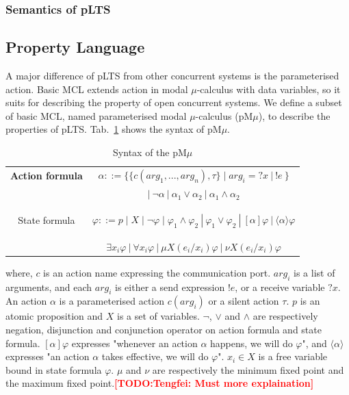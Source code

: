 \documentclass[runningheads,a4paper]{llncs}
\newcommand{\TODO}[1]{\textcolor{red}{\textbf{[TODO:#1]}}}
\begin{document}
\subsubsection{Semantics of pLTS}





\subsection{Property Language}

A major difference of pLTS from other concurrent systems is the parameterised action. Basic MCL\cite{radu2008mcl} extends action in modal $\mu$-calculus with data variables, so it suits for describing the property of open concurrent systems. We define a subset of basic MCL, named parameterised modal $\mu$-calculus (pM$\mu$), to describe the properties of pLTS. Tab.~\ref{mcl} shows the syntax of pM$\mu$.

\begin{table}
	\setlength\tabcolsep{18pt}%
	\centering 
	\caption{Syntax of the pM$\mu$} 
	\label{mcl}
	\begin{tabular}{>{\bfseries}c| c } 
		\hline 		
	Action formula 	&     $\alpha ::= \{\{c(arg_{1}, ..., arg_{n}), \tau\}\mid arg_{i}=?x\ |\ !e\  \}$                  \\
	& $|\ \neg\alpha \ |\ \alpha_{1}\vee\alpha_{2}\ |\ \alpha_{1}\wedge\alpha_{2}$   \\ 	\hline 
		
	State formula 	&  $\varphi ::= p \mid X \mid \neg\varphi \mid \varphi_{1}\wedge\varphi_{2}\ |\ \varphi_{1}\vee\varphi_{2} \ |\ [\alpha]\varphi \ |\ \langle\alpha\rangle\varphi$ \\ 
	& $\exists x_{i}\varphi\ |\ \forall x_{i}\varphi\ |\ \mu X(e_{i}/x_{i})\varphi\ |\ \nu X(e_{i}/x_{i})\varphi$	\\ \hline 
	\end{tabular} 
\end{table} 
 
 where, $c$ is an action name expressing the communication port. $arg_{i}$ is a list of arguments, and each $arg_{i}$ is either a send expression $!e$, or a receive variable $?x$. An action $\alpha$ is a parameterised action $c(arg_{i})$ or a silent action $\tau$. $p$ is an atomic proposition and $X$ is a set of variables. $\neg$, $\vee$ and $\wedge$ are respectively negation, disjunction and conjunction operator on action formula and state formula. $[\alpha]\varphi$ expresses "whenever an action $\alpha$ happens, we will do $\varphi$", and $\langle\alpha\rangle$ expresses "an action $\alpha$ takes effective, we will do $\varphi$". $x_{i}\in X$ is a free variable bound in state formula $\varphi$. $\mu$ and $\nu$ are respectively the minimum fixed point and the maximum fixed point.\TODO{Tengfei: Must more explaination}
\end{document}
